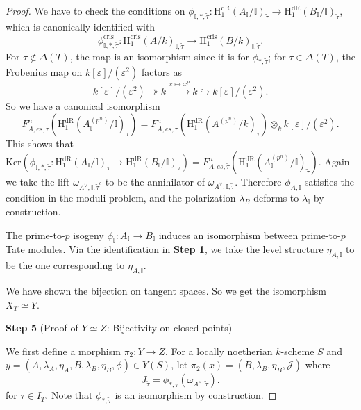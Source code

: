 \documentclass{article}
\begin{document}
\begin{proof}
We have to check the conditions on $\phi_{\mathbb{I},\ast,\tilde\tau}:\text{H}_1^{\text{dR}}(A_{\mathbb{I}}/\mathbb{I})_{\tilde\tau}\to\text{H}_1^{\text{dR}}(B_{\mathbb{I}}/\mathbb{I})_{\tilde\tau}$, which is canonically identified with
\begin{equation}
\phi_{\mathbb{I},\ast,\tilde\tau}^{\text{cris}}:\text{H}_1^{\text{cris}}(A/k)_{\mathbb{I},\tilde\tau}\to\text{H}_1^{\text{cris}}(B/k)_{\mathbb{I},\tilde\tau}.
\end{equation}
For $\tau\notin \Delta(T)$, the map is an isomorphism since it is for $\phi_{\ast,\tilde\tau}$; for $\tau\in\Delta(T)$, the Frobenius map on $k[\varepsilon]/(\varepsilon^2)$ factors as
\begin{equation}
k[\varepsilon]/(\varepsilon^2)\twoheadrightarrow k\xrightarrow{x\mapsto x^p}k\hookrightarrow k[\varepsilon]/(\varepsilon^2).
\end{equation}
So we have a canonical isomorphism
\begin{equation}
F^n_{A,es,\tilde\tau}(\text{H}_1^{\text{dR}}(A^{(p^n)}_{\mathbb{I}}/\mathbb{I})_{\tilde\tau})=F^n_{A,es,\tilde\tau}(\text{H}_1^{\text{dR}}(A^{(p^n)}/k)_{\tilde\tau})\otimes_kk[\varepsilon]/(\varepsilon^2).
\end{equation}
This shows that $\text{Ker}(\phi_{\mathbb{I},\ast,\tilde\tau}:\text{H}_1^{\text{dR}}(A_{\mathbb{I}}/\mathbb{I})_{\tilde\tau}\to \text{H}_1^{\text{dR}}(B_{\mathbb{I}}/\mathbb{I})_{\tilde\tau})=F_{A,es,\tilde\tau}^n(\text{H}_1^{\text{dR}}(A_{\mathbb{I}}^{(p^n)}/\mathbb{I})_{\tilde\tau})$. Again we take the lift $\omega_{A^\vee,\mathbb{I},\tilde\tau^c}$ to be the annihilator of $\omega_{A^\vee,\mathbb{I},\tilde\tau}$.
Therefore $\phi_{A,\mathbb{I}}$ satisfies the condition in the moduli problem, and the polarization $\lambda_B$ deforms to $\lambda_{\mathbb{I}}$ by construction.

The prime-to-$p$ isogeny $\phi_{\mathbb{I}}:A_{\mathbb{I}}\to B_{\mathbb{I}}$ induces an isomorphism between prime-to-$p$ Tate modules. Via the identification in \textbf{Step 1}, we take the level structure $\eta_{A,\mathbb{I}}$ to be the one corresponding to $\eta_{A,\mathbb{I}}$.

We have shown the bijection on tangent spaces. So we get the isomorphism $X_T\simeq Y$.



\medskip
\noindent
\textbf{Step 5} (Proof of $Y\simeq Z$: Bijectivity on closed points)

We first define a morphism $\pi_2:Y\to Z$. For a locally noetherian $k$-scheme $S$ and $y=(A,\lambda_A,\eta_A,B,\lambda_B,\eta_B,\phi)\in Y(S)$, let $\pi_2(x)=(B,\lambda_B,\eta_B,\mathcal{J})$ where
\begin{equation}
J_{\tilde\tau}=\phi_{\ast,\tilde\tau}(\omega_{A^\vee,\tilde\tau}).
\end{equation}
for $\tau\in I_T$. Note that $\phi_{\ast,\tilde\tau}$ is an isomorphism by construction.


\end{proof}
\end{document}
